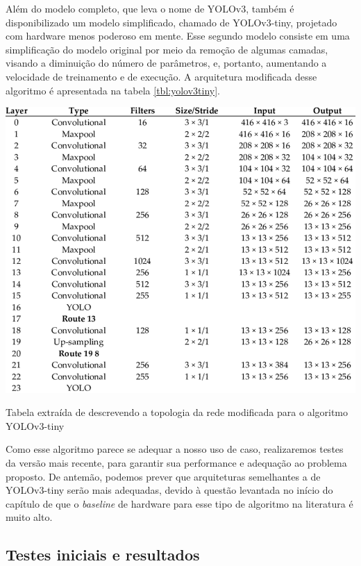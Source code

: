 \documentclass[]{politex}
\begin{document}
Além do modelo completo, que leva o nome de YOLOv3, também é disponibilizado um modelo simplificado, chamado de YOLOv3-tiny, projetado com hardware menos poderoso em mente. Esse segundo modelo consiste em uma simplificação do modelo original por meio da remoção de algumas camadas, visando a diminuição do número de parâmetros, e, portanto, aumentando a velocidade de treinamento e de execução. A arquitetura modificada desse algoritmo é apresentada na tabela \ref{tbl:yolov3tiny}.

\begin{table}[ht]
  \centering
  \includegraphics[scale=0.38]{img/yolov3-tiny.png}
  \caption{Tabela extraída de \citeyear{tfyolo} \citeauthor{tfyolo} descrevendo a topologia da rede modificada para o algoritmo YOLOv3-tiny}
  \label{tbl:yolov3tiny}
\end{table}

Como esse algoritmo parece se adequar a nosso uso de caso, realizaremos testes da versão mais recente, para garantir sua performance e adequação ao problema proposto. De antemão, podemos prever que arquiteturas semelhantes a de YOLOv3-tiny serão mais adequadas, devido à questão levantada no início do capítulo de que o \textit{baseline} de hardware para esse tipo de algoritmo na literatura é muito alto.

\subsection{Testes iniciais e resultados}
\end{document}
